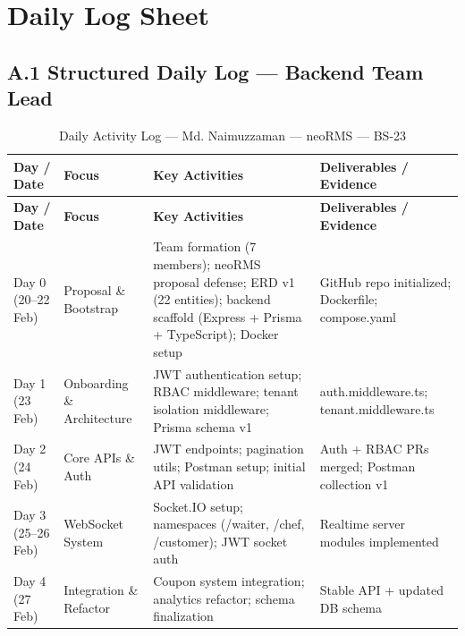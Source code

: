 \chapter{Daily Log Sheet}
\label{app:dailylog}

\section*{A.1 Structured Daily Log --- Backend Team Lead}

\setlength{\LTpre}{0pt}
\setlength{\LTpost}{0pt}

\begin{longtable}{p{}p{}p{}p{}}

\caption{Daily Activity Log --- Md. Naimuzzaman --- neoRMS --- BS-23}
\label{tab:dailylog} \\

\hline
\textbf{Day / Date} & \textbf{Focus} & \textbf{Key Activities} & \textbf{Deliverables / Evidence} \\
\hline
\endfirsthead

\hline
\textbf{Day / Date} & \textbf{Focus} & \textbf{Key Activities} & \textbf{Deliverables / Evidence} \\
\hline
\endhead

Day 0 (20--22 Feb) &
Proposal \& Bootstrap &
Team formation (7 members); neoRMS proposal defense; ERD v1 (22 entities); backend scaffold (Express + Prisma + TypeScript); Docker setup &
GitHub repo initialized; Dockerfile; compose.yaml \\

Day 1 (23 Feb) &
Onboarding \& Architecture &
JWT authentication setup; RBAC middleware; tenant isolation middleware; Prisma schema v1 &
auth.middleware.ts; tenant.middleware.ts \\

Day 2 (24 Feb) &
Core APIs \& Auth &
JWT endpoints; pagination utils; Postman setup; initial API validation &
Auth + RBAC PRs merged; Postman collection v1 \\

Day 3 (25--26 Feb) &
WebSocket System &
Socket.IO setup; namespaces (/waiter, /chef, /customer); JWT socket auth &
Realtime server modules implemented \\

Day 4 (27 Feb) &
Integration \& Refactor &
Coupon system integration; analytics refactor; schema finalization &
Stable API + updated DB schema \\


\end{longtable}
